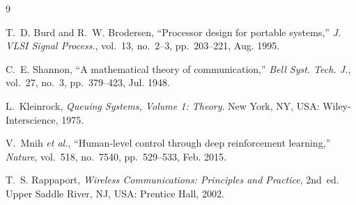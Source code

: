 \documentclass[journal,twoside,letterpaper]{IEEEtran}
\begin{document}
\begin{thebibliography}{9}

T.~D. Burd and R.~W. Brodersen,
``Processor design for portable systems,''
\emph{J. VLSI Signal Process.}, vol.~13, no.~2--3, pp.~203--221, Aug. 1995.

C.~E. Shannon,
``A mathematical theory of communication,''
\emph{Bell Syst. Tech. J.}, vol.~27, no.~3, pp.~379--423, Jul. 1948.

L.~Kleinrock,
\emph{Queuing Systems, Volume 1: Theory}.
New York, NY, USA: Wiley-Interscience, 1975.

V.~Mnih \emph{et al.},
``Human-level control through deep reinforcement learning,''
\emph{Nature}, vol.~518, no.~7540, pp.~529--533, Feb. 2015.

T.~S. Rappaport,
\emph{Wireless Communications: Principles and Practice}, 2nd~ed.
Upper Saddle River, NJ, USA: Prentice Hall, 2002.

\end{thebibliography}
\end{document}
